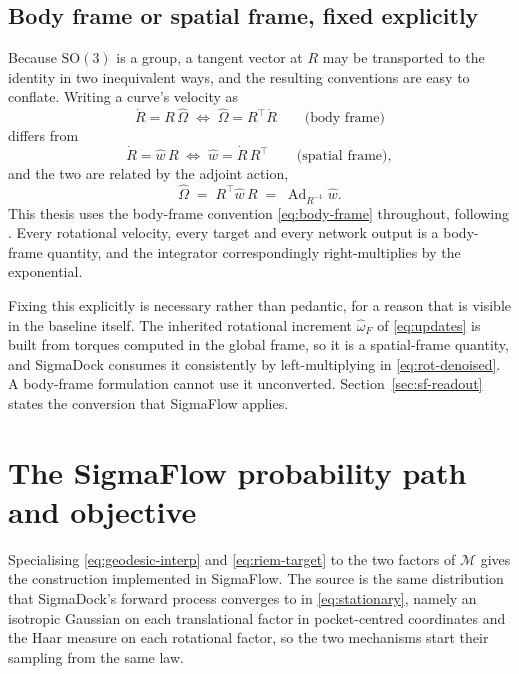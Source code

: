 \documentclass[11pt,a4paper]{report}
\theoremstyle{plain}
\theoremstyle{definition}
\theoremstyle{remark}
\newcommand{\SOthree}{\mathrm{SO}(3)}
\newcommand{\Mfd}{\mathcal{M}}
\newcommand{\Ad}{\operatorname{Ad}}
\newcommand{\skewm}[1]{\widehat{#1}}
\newcommand{\Rot}{R}
\begin{document}
\subsection{Body frame or spatial frame, fixed explicitly}
\label{sec:trivialisation}

Because $\SOthree$ is a group, a tangent vector at $\Rot$ may be transported to
the identity in two inequivalent ways, and the resulting conventions are easy
to conflate. Writing a curve's velocity as
\begin{equation}
  \dot{\Rot} = \Rot\,\skewm{\Omega}
  \;\Longleftrightarrow\;
  \skewm{\Omega} = \Rot^\top \dot{\Rot}
  \qquad \text{(body frame)}
  \label{eq:body-frame}
\end{equation}
differs from
\begin{equation}
  \dot{\Rot} = \skewm{w}\,\Rot
  \;\Longleftrightarrow\;
  \skewm{w} = \dot{\Rot}\,\Rot^\top
  \qquad \text{(spatial frame)},
  \label{eq:spatial-frame}
\end{equation}
and the two are related by the adjoint action,
\begin{equation}
  \skewm{\Omega} \;=\; \Rot^\top \skewm{w}\,\Rot
  \;=\; \Ad_{\Rot^{-1}}\skewm{w} .
  \label{eq:adjoint}
\end{equation}
This thesis uses the body-frame convention \eqref{eq:body-frame} throughout,
following \citet{marsden1999introduction}. Every rotational velocity, every
target and every network output is a body-frame quantity, and the integrator
correspondingly right-multiplies by the exponential.

Fixing this explicitly is necessary rather than pedantic, for a reason that is
visible in the baseline itself. The inherited rotational increment
$\skewm{\omega}_F$ of \eqref{eq:updates} is built from torques computed in the
global frame, so it is a spatial-frame quantity, and SigmaDock consumes it
consistently by left-multiplying in \eqref{eq:rot-denoised}. A body-frame
formulation cannot use it unconverted. Section~\ref{sec:sf-readout} states the
conversion that SigmaFlow applies.

\section{The SigmaFlow probability path and objective}
\label{sec:sigmaflow-objective}

Specialising \eqref{eq:geodesic-interp} and \eqref{eq:riem-target} to the two
factors of $\Mfd$ gives the construction implemented in SigmaFlow. The source
is the same distribution that SigmaDock's forward process converges to in
\eqref{eq:stationary}, namely an isotropic Gaussian on each translational
factor in pocket-centred coordinates and the Haar measure on each rotational
factor, so the two mechanisms start their sampling from the same law.
\end{document}
